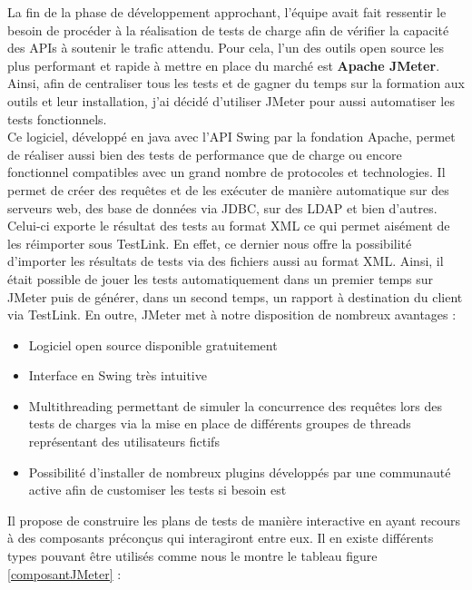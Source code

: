 	La fin de la phase de développement approchant, l’équipe avait fait ressentir le besoin de procéder à la réalisation de tests de charge afin de vérifier la capacité des APIs à soutenir le trafic attendu. Pour cela, l’un des outils open source les plus performant et rapide à mettre en place du marché est \textbf{Apache JMeter}. Ainsi, afin de centraliser tous les tests et de gagner du temps sur la formation aux outils et leur installation, j’ai décidé d’utiliser JMeter pour aussi automatiser les tests fonctionnels. \\
	
	Ce logiciel, développé en java avec l’API Swing par la fondation Apache, permet de réaliser aussi bien des tests de performance que de charge ou encore fonctionnel compatibles avec un grand nombre de protocoles et technologies. Il permet de créer des requêtes et de les exécuter de manière automatique sur des serveurs web, des base de données via JDBC, sur des LDAP et bien d’autres. Celui-ci exporte le résultat des tests au format XML ce qui permet aisément de les réimporter sous TestLink. En effet, ce dernier nous offre la possibilité d’importer les résultats de tests via des fichiers aussi au format XML. Ainsi, il était possible de jouer les tests automatiquement dans un premier temps sur JMeter puis de générer, dans un second temps,  un rapport à destination du client via TestLink. En outre, JMeter met à notre disposition de nombreux avantages : \\
	
\begin{itemize}
	\item Logiciel open source disponible gratuitement
	\item Interface en Swing très intuitive
	\item Multithreading permettant de simuler la concurrence des requêtes lors des tests de charges via la mise en place de différents groupes de threads représentant des utilisateurs fictifs
	\item Possibilité d’installer de nombreux plugins développés par une communauté active afin de customiser les tests si besoin est \\
\end{itemize}
 
	Il propose de construire les plans de tests de manière interactive en ayant recours à des composants préconçus qui interagiront entre eux. Il en existe différents types pouvant être utilisés comme nous le montre le tableau figure \ref{composantJMeter} : \\


